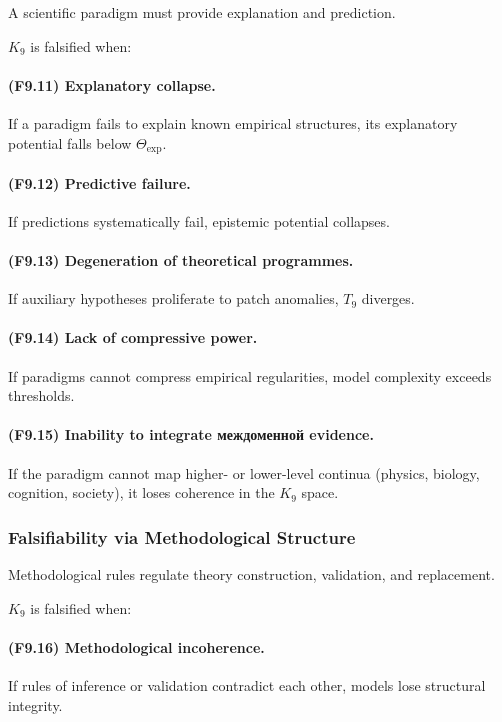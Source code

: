A scientific paradigm must provide explanation and prediction.

$K_9$ is falsified when:

\paragraph{(F9.11) Explanatory collapse.}
If a paradigm fails to explain known empirical structures,
its explanatory potential falls below $\Theta_{\mathrm{exp}}$.

\paragraph{(F9.12) Predictive failure.}
If predictions systematically fail,
epistemic potential collapses.

\paragraph{(F9.13) Degeneration of theoretical programmes.}
If auxiliary hypotheses proliferate to patch anomalies,
$T_9$ diverges.

\paragraph{(F9.14) Lack of compressive power.}
If paradigms cannot compress empirical regularities,
model complexity exceeds thresholds.

\paragraph{(F9.15) Inability to integrate междоменной evidence.}
If the paradigm cannot map higher- or lower-level continua
(physics, biology, cognition, society),
it loses coherence in the $K_9$ space.



\subsubsection{Falsifiability via Methodological Structure}

Methodological rules regulate theory construction, validation,
and replacement.

$K_9$ is falsified when:

\paragraph{(F9.16) Methodological incoherence.}
If rules of inference or validation contradict each other,
models lose structural integrity.

